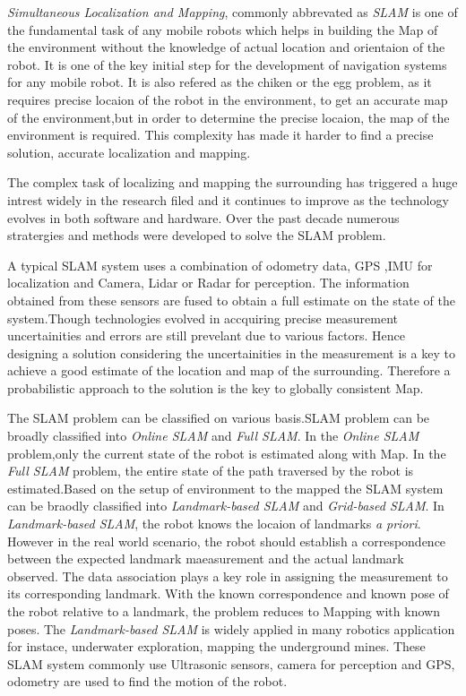 
\textit{Simultaneous Localization and Mapping}, commonly abbrevated as \textit{SLAM} is one of the fundamental task of any mobile robots which helps in building
the Map of the environment without the knowledge of actual location and orientaion of the robot. It is one of the key initial step for the development of
navigation systems for any mobile robot. It is also refered as  the chiken or the egg problem, as it requires precise locaion of the robot in the environment,
to get an accurate map of the environment,but in order to determine the precise locaion, the map of the environment is required. This complexity has made 
it harder to find a precise solution, accurate localization and mapping.

The complex task of localizing and mapping the surrounding has triggered a huge intrest widely in the research filed and it continues to  improve as the 
technology evolves in both software and hardware. Over the past decade numerous stratergies and methods were developed to solve the SLAM problem. 

A typical SLAM system uses a combination of odometry data, GPS ,IMU for localization and Camera, Lidar or Radar for perception. The information obtained from 
these sensors are fused to obtain a full estimate on the state of the system.Though technologies evolved 
in accquiring precise measurement uncertainities and errors are still prevelant due to various factors. Hence designing a solution considering the uncertainities 
in the measurement is a key to achieve a good estimate of the location and map of the surrounding. Therefore a probabilistic approach to the solution is the key 
to globally consistent Map.

The SLAM problem can be classified on various basis.SLAM problem can be broadly classified into \textit{Online SLAM} and \textit{Full SLAM}. 
In the \textit{Online SLAM} problem,only the current state of the robot is estimated along with Map. In the \textit{Full SLAM} problem, the entire state of the 
path traversed by the robot is estimated.Based on the setup of environment to the mapped the SLAM system can be braodly classified into \textit{Landmark-based SLAM} and 
\textit{Grid-based SLAM}. In \textit{Landmark-based SLAM}, the robot knows the locaion of landmarks \textit{a priori}. 
However in the real world scenario, the robot should establish a correspondence between the expected landmark maeasurement and the actual landmark observed. 
The data association plays a key role in assigning the measurement to  its corresponding landmark.
With the known correspondence and known pose of the robot relative to a landmark, the problem reduces to Mapping with known poses. The \textit{Landmark-based SLAM}
is widely applied in many robotics application for instace, underwater exploration, mapping the underground mines. These SLAM system commonly use Ultrasonic
sensors, camera for perception and GPS, odometry are used to find the motion of the robot.

